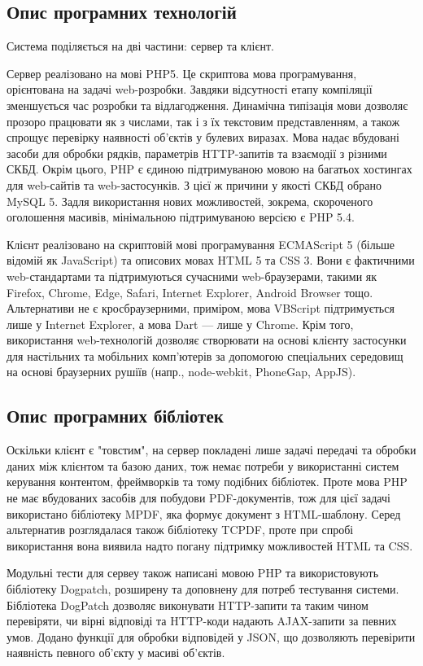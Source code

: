 \subsection{Опис програмних технологій}
Система поділяється на дві частини: сервер та клієнт.

Сервер реалізовано на мові PHP5. Це скриптова мова програмування, орієнтована на задачі web-розробки. Завдяки відсутності етапу компіляції зменшується час розробки та відлагодження. Динамічна типізація мови дозволяє прозоро працювати як з числами, так і з їх текстовим представленням, а також спрощує перевірку наявності об'єктів у булевих виразах. Мова надає вбудовані засоби для обробки рядків, параметрів HTTP-запитів та взаємодії з різними СКБД. Окрім цього, PHP є єдиною підтримуваною мовою на багатьох хостингах для web-сайтів та web-застосунків. З цієї ж причини у якості СКБД обрано MySQL 5. Задля використання нових можливостей, зокрема, скороченого оголошення масивів, мінімальною підтримуваною версією є PHP 5.4.

Клієнт реалізовано на скриптовій мові програмування ECMAScript 5 (більше відомій як JavaScript) та описових мовах HTML 5 та CSS 3. Вони є фактичними web-стандартами та підтримуються сучасними web-браузерами, такими як Firefox, Chrome, Edge, Safari, Internet Explorer, Android Browser тощо. Альтернативи не є кросбраузерними, приміром, мова VBScript підтримується лише у Internet Explorer, а мова Dart --- лише у Chrome. Крім того, використання web-технологій дозволяє створювати на основі клієнту застосунки для настільних та мобільних комп'ютерів за допомогою спеціальних середовищ на основі браузерних рушіїв (напр., node-webkit, PhoneGap, AppJS).

\subsection{Опис програмних бібліотек}
Оскільки клієнт є "товстим", на сервер покладені лише задачі передачі та обробки даних між клієнтом та базою даних, тож немає потреби у використанні систем керування контентом, фреймворків та тому подібних бібліотек. Проте мова PHP не має вбудованих засобів для побудови PDF-документів, тож для цієї задачі використано бібліотеку MPDF, яка формує документ з HTML-шаблону. Серед альтернатив розглядалася також бібліотеку TCPDF, проте при спробі використання вона виявила надто погану підтримку можливостей HTML та CSS.

Модульні тести для сервеу також написані мовою PHP та використовують бібліотеку Dogpatch, розширену та доповнену для потреб тестування системи. Бібліотека DogPatch дозволяє виконувати HTTP-запити та таким чином перевіряти, чи вірні відповіді та HTTP-коди надають AJAX-запити за певних умов. Додано функції для обробки відповідей у JSON, що дозволяють перевірити наявність певного об'єкту у масиві об'єктів.

